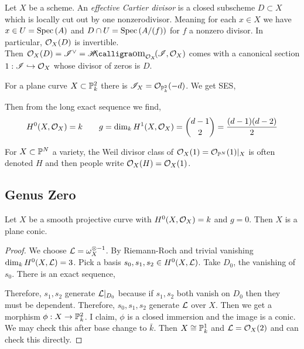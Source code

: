 \documentclass[12pt]{article}
\begin{document}
\begin{defn}
Let $X$ be a scheme. An \textit{effective Cartier divisor} is a closed subscheme $D \subset X$ which is locally cut out by one nonzerodivisor. Meaning for each $x \in X$ we have $x \in U = \Spec{A}$ and $D \cap U = \Spec{A/(f)}$ for $f$ a nonzero divisor. In particular, $\struct{X}(D)$ is invertible.
\bigskip\\
Then $\struct{X}(D) = \I^\vee = \shHom{\struct{X}}{\I}{\struct{X}}$ comes with a canonical section $1 : \I \embed \struct{X}$ whose divisor of zeros is $D$.
\end{defn}

\begin{rmk}
For a plane curve $X \subset \P^2_k$ there is $\I_X = \struct{\P^2_k}(-d)$. We get SES,
\begin{center}
\end{center}
Then from the long exact sequence we find, 
\[ H^0(X, \struct{X}) = k \quad \quad g = \dim_k H^1(X, \struct{X}) =  { d - 1 \choose 2 } = \frac{(d - 1)(d - 2)}{2} \]
\end{rmk}

\begin{rmk}
For $X \subset \P^N$ a variety, the Weil divisor class of $\struct{X}(1) = \struct{\P^N}(1)|_X$ is often denoted $H$ and then people write $\struct{X}(H) = \struct{X}(1)$. 
\end{rmk}

\subsection{Genus Zero}

\begin{prop}
Let $X$ be a smooth projective curve with $H^0(X, \struct{X}) = k$ and $g = 0$. Then $X$ is a plane conic.
\end{prop}

\begin{proof}
We choose $\L = \omega^{\otimes -1}_X$. 
By Riemann-Roch and trivial vanishing $\dim_k H^0(X, \L) = 3$. Pick a basis $s_0, s_1, s_2 \in H^0(X, \L)$. Take $D_0$, the vanishing of $s_0$. There is an exact sequence,
\begin{center}
\end{center}
Therefore, $s_1, s_2$ generate $\L |_{D_0}$ because if $s_1, s_2$ both vanish on $D_0$ then they must be dependent. Therefore, $s_0, s_1, s_2$ generate $\L$ over $X$. Then we get a morphism $\phi : X \to \P^2_k$. I claim, $\phi$ is a closed immersion and the image is a conic. 
\bigskip\\
We may check this after base change to $\bar{k}$. Then $X \cong \P^1_k$ and $\L = \struct{X}(2)$ and can check this directly. 
\end{proof}
\end{document}
